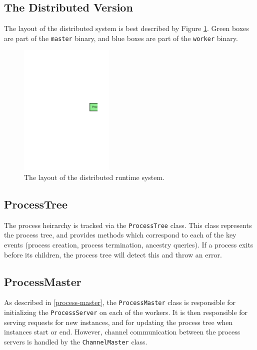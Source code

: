 \subsection{The Distributed Version}

The layout of the distributed system is best described by Figure
\ref{dist-model}. Green boxes are part of the \texttt{master} binary, and
blue boxes are part of the \texttt{worker} binary.

\begin{figure}[H]
  \centering
  \includegraphics[width=0.4\textwidth]{diagrams/distributed_system}
  \caption{The layout of the distributed runtime system.}
  \label{dist-model}
\end{figure}

\subsection{ProcessTree}

The process heirarchy is tracked via the \texttt{ProcessTree} class. This class
represents the process tree, and provides methods which correspond to each of
the key events (process creation, process termination, ancestry queries). If
a process exits before its children, the process tree will detect this and throw
an error.

\subsection{ProcessMaster}

As described in \ref{process-master}, the \texttt{ProcessMaster} class is
responsible for initializing the \texttt{ProcessServer} on each of the workers.
It is then responsible for serving requests for new instances, and for updating
the process tree when instances start or end. However, channel communication
between the process servers is handled by the \texttt{ChannelMaster} class.

